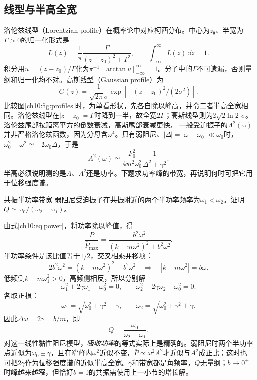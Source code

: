 \subsection{线型与半高全宽}
洛伦兹线型（Lorentzian profile）在概率论中对应柯西分布。中心为$z_0$、半宽为$\Gamma>0$的归一化形式是
\[
 L(z)=\frac1\pi\frac{\Gamma}{(z-z_0)^2+\Gamma^2},\qquad
 \int_{-\infty}^{\infty}L(z)\,\dd z=1.
\]
积分用$u=(z-z_0)/\Gamma$化为$\pi^{-1}[\arctan u]_{-\infty}^{\infty}=1$。分子中的$\Gamma$不可遗漏，否则量纲和归一化均不对。高斯线型（Gaussian profile）为
\[
 G(z)=\frac1{\sqrt{2\pi}\sigma}\exp[-(z-z_0)^2/(2\sigma^2)].
\]
比较图\ref{ch10:fig:profiles}时，为单看形状，先各自除以峰高，并令二者半高全宽相同。洛伦兹线型在$|z-z_0|=\Gamma$时降到一半，故全宽$2\Gamma$；高斯线型则为$2\sqrt{2\ln2}\,\sigma$。洛伦兹尾部按距离平方的倒数衰减，高斯尾部衰减更快。
\chTenProfileFigure
一般受迫振子的$A^2(\omega)$并非严格洛伦兹函数，因为分母含$\omega^4$。只有弱阻尼、$|\Delta|=|\omega-\omega_0|\ll\omega_0$时，$\omega_0^2-\omega^2\simeq-2\omega_0\Delta$，于是
\[
 A^2(\omega)\simeq\frac{F_0^2}{4m^2\omega_0^2}\frac1{\Delta^2+\gamma^2}.
\]
半高必须说明测的是$A$、$A^2$还是功率。下题求功率峰的带宽，再说明何时可把它用于位移强度谱。

\begin{origexamplebox}{共振半功率带宽}\label{ch10:ex:bandwidth}
弱阻尼受迫振子在共振附近的两个半功率频率为$\omega_1<\omega_2$。证明$Q\simeq\omega_0/(\omega_2-\omega_1)$。

\ThQBandwidth
\end{origexamplebox}
\begin{xesolution}
\ThABandwidth

由式\eqref{ch10:eq:power}，将功率除以峰值，得
\[
 \frac{\overline P}{\overline P_{\max}}
 =\frac{b^2\omega^2}{(k-m\omega^2)^2+b^2\omega^2}.
\]
半功率条件是该比值等于$1/2$，交叉相乘并移项：
\[
 2b^2\omega^2=(k-m\omega^2)^2+b^2\omega^2
 \quad\Longrightarrow\quad|k-m\omega^2|=b\omega.
\]
低频侧$k-m\omega_1^2>0$，高频侧相反，所以分别解
\[
 \omega_1^2+2\gamma\omega_1-\omega_0^2=0,
 \qquad\omega_2^2-2\gamma\omega_2-\omega_0^2=0.
\]
各取正根：
\[
 \omega_1=\sqrt{\omega_0^2+\gamma^2}-\gamma,
 \qquad\omega_2=\sqrt{\omega_0^2+\gamma^2}+\gamma.
\]
因此$\Delta\omega=2\gamma=b/m$，即
\[
 \boxed{Q=\frac{\omega_0}{\omega_2-\omega_1}}.
\]
对这一线性黏性阻尼模型，\emph{吸收功率}的等式实际上是精确的。弱阻尼时两个半功率点近似为$\omega_0\pm\gamma$，且在窄峰内$\omega^2$近似不变，$\overline P\propto\omega^2A^2$才近似与$A^2$成正比；这时也可把$2\gamma$作为位移强度谱的近似半高全宽。$\gamma$和带宽都是角频率，$Q$无量纲；$b\to0^+$时峰越来越窄，但恰好$b=0$的共振需使用上一小节的增长解。
\end{xesolution}


